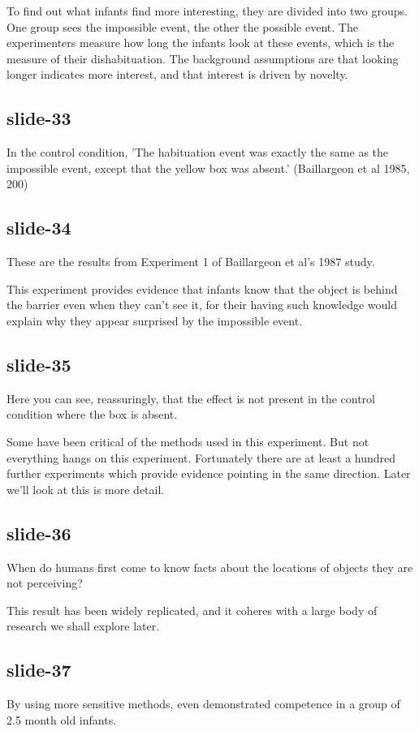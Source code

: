\documentclass[12pt,\papersize]{extarticle}
\begin{document}
To find out what infants find more interesting, they are divided into two groups.
One group sees the impossible event, the other the possible event.
The experimenters measure how long the infants look at these events, which is the measure of
their dishabituation.  The background assumptions are that looking longer indicates more
interest, and that interest is driven by novelty.

\subsection{slide-33}
In the control condition,
'The habituation event was exactly the same as the impossible event, except that the yellow
box was absent.' (Baillargeon et al 1985, 200)

\subsection{slide-34}
These are the results from Experiment 1 of Baillargeon et al's 1987 study.

This experiment provides evidence that infants know that the object is behind the barrier
even when they can't see it, for their having such knowledge would explain why they appear
surprised by the impossible event.

\subsection{slide-35}
Here you can see, reassuringly, that the effect is not present in the control condition
where the box is absent.

Some have been critical of the methods used in this experiment.
But not everything hangs on this experiment.
Fortunately there are at least a hundred further experiments which provide evidence pointing in the same direction.
Later we'll look at this is more detail.

\subsection{slide-36}
When do humans first come to know facts about the locations of objects they are not perceiving?

This result has been widely replicated, and it coheres with a large body of research we shall
explore later.

\subsection{slide-37}
By using more sensitive methods, \citet{Aguiar:1999jq} even demonstrated competence in a group
of 2.5 month old infants.
\end{document}
